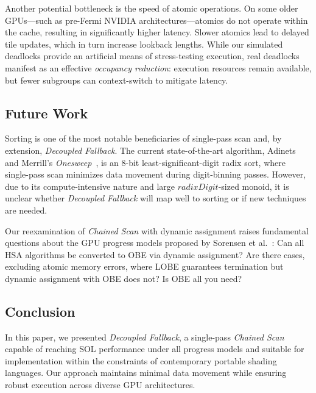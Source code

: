 \documentclass[acmsmall, manuscript, screen, review, anonymous]{acmart}
\begin{document}
Another potential bottleneck is the speed of atomic operations. On some older GPUs---such as pre-Fermi NVIDIA architectures---atomics do not operate within the cache, resulting in significantly higher latency. Slower atomics lead to delayed tile updates, which in turn increase lookback lengths. While our simulated deadlocks provide an artificial means of stress-testing execution, real deadlocks manifest as an effective \emph{occupancy reduction}: execution resources remain available, but fewer subgroups can context-switch to mitigate latency.

\subsection{Future Work}
Sorting is one of the most notable beneficiaries of single-pass scan and, by extension, \emph{Decoupled Fallback}. The current state-of-the-art algorithm, Adinets and Merrill’s \emph{Onesweep}~\cite{adinets2022onesweepfastersignificantdigit}, is an 8-bit least-significant-digit radix sort, where single-pass scan minimizes data movement during digit-binning passes. However, due to its compute-intensive nature and large $radixDigit$-sized monoid, it is unclear whether \emph{Decoupled Fallback} will map well to sorting or if new techniques are needed.

Our reexamination of \emph{Chained Scan} with dynamic assignment raises fundamental questions about the GPU progress models proposed by Sorensen et al.~\cite{sorensen2021}: Can all HSA algorithms be converted to OBE via dynamic assignment? Are there cases, excluding atomic memory errors, where LOBE guarantees termination but dynamic assignment with OBE does not? Is OBE all you need?

\subsection{Conclusion}
In this paper, we presented \emph{Decoupled Fallback}, a single-pass \emph{Chained Scan} capable of reaching SOL performance under all progress models and suitable for implementation within the constraints of contemporary portable shading languages. Our approach maintains minimal data movement while ensuring robust execution across diverse GPU architectures.

\begin{acks}
\end{acks}



\end{document}
